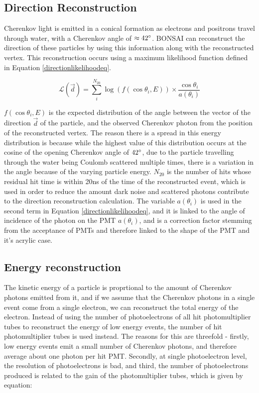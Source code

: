 \subsection{Direction Reconstruction}

Cherenkov light is emitted in a conical formation as electrons and positrons travel through water, with a Cherenkov angle of $\approx 42\degree$. BONSAI can reconstruct the direction of these particles by using this information along with the reconstructed vertex. This reconstruction occurs using a maximum likelihood function defined in Equation \ref{directionlikelihoodeq}.

\begin{equation}
    \mathcal{L}(\vec{d})=\sum_{i}^{N_{20}} \log (f(\cos\theta_{i}, E))\times\frac{\cos\theta_{i}}{a(\theta_{i})}
    \label{directionlikelihoodeq}
\end{equation}

$f(\cos\theta_{i},E)$ is the expected distribution of the angle between the vector of the direction $\vec{d}$ of the particle, and the observed Cherenkov photon from the position of the reconstructed vertex. The reason there is a spread in this energy distribution is because while the highest value of this distribution occurs at the cosine of the opening Cherenkov angle of $42\degree$, due to the particle travelling through the water being Coulomb scattered multiple times, there is a variation in the angle because of the varying particle energy. $N_{20}$ is the number of hits whose residual hit time is within 20ns of the time of the reconstructed event, which is used in order to reduce the amount dark noise and scattered photons contribute to the direction reconstruction calculation. The  variable $a(\theta_{i})$ is used in the second term in Equation \ref{directionlikelihoodeq}, and it is linked to the angle of incidence of the photon on the PMT $a(\theta_{i})$, and is a correction factor stemming from the acceptance of PMTs and therefore linked to the shape of the PMT and it's acrylic case. 


\subsection{Energy reconstruction}

The kinetic energy of a particle is proprtional to the amount of Cherenkov photons emitted from it, and if we assume that the Cherenkov photons in a single event come from a single electron, we can reconstruct the total energy of the electron. Instead of using the number of photoelectrons of all hit photomultiplier tubes to reconstruct the energy of low energy events, the number of hit photomultiplier tubes is used instead. The reasons for this are threefold - firstly, low energy events emit a small number of Cherenkov photons, and therefore average about one photon per hit PMT. Secondly, at single photoelectron level, the resolution of photoelectrons is bad, and third, the number of photoelectrons produced is related to the gain of the photomultiplier tubes, which is given by equation:


